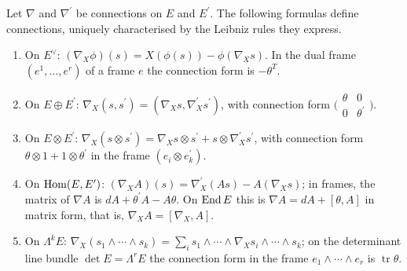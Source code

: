 \begin{proposition}\label{connections:proposition-induced-connections}
Let $\nabla$ and $\nabla^{\prime}$ be connections on $E$ and $E^{\prime}$. The following formulas define connections, uniquely characterised by the Leibniz rules they express.
\begin{enumerate}
\item On $E^\vee$: $(\nabla_X\phi)(s) = X(\phi(s)) - \phi(\nabla_Xs)$. In the dual frame $(e^1, \ldots, e^r)$ of a frame $e$ the connection form is $-\theta^T$.
\item On $E \oplus E^{\prime}$: $\nabla_X(s, s^{\prime}) = (\nabla_Xs, \nabla^{\prime}_Xs^{\prime})$, with connection form $\bigl(\begin{smallmatrix}\theta & 0\\ 0 & \theta^{\prime}\end{smallmatrix}\bigr)$.
\item On $E \otimes E^{\prime}$: $\nabla_X(s \otimes s^{\prime}) = \nabla_Xs \otimes s^{\prime} + s \otimes \nabla^{\prime}_Xs^{\prime}$, with connection form $\theta \otimes 1 + 1 \otimes \theta^{\prime}$
in the frame $(e_i \otimes e^{\prime}_k)$.
\item On $\operatorname{Hom}(E, E^{\prime})$: $(\nabla_XA)(s) = \nabla^{\prime}_X(As) - A(\nabla_Xs)$; in frames, the matrix of $\nabla A$ is $dA + \theta^{\prime}A - A\theta$. On $\operatorname{End} E$ this is
$\nabla A = dA + [\theta, A]$ in matrix form, that is, $\nabla_XA = [\nabla_X, A]$.
\item On $\Lambda^kE$: $\nabla_X(s_1 \wedge \cdots \wedge s_k) = \sum_is_1 \wedge \cdots \wedge \nabla_Xs_i \wedge \cdots \wedge s_k$; on the determinant line bundle $\det E = \Lambda^rE$ the
connection form in the frame $e_1 \wedge \cdots \wedge e_r$ is $\operatorname{tr}\theta$.
\end{enumerate}
\end{proposition}

